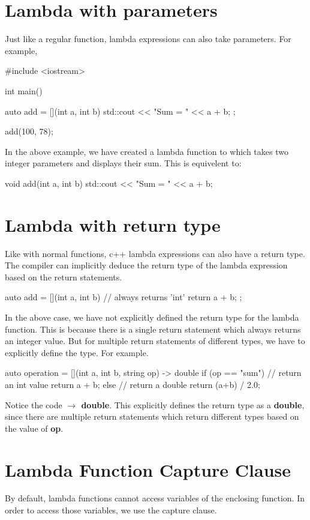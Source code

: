 \documentclass{report}
\begin{document}
  \section{Lambda with parameters}
  Just like a regular function, lambda expressions can also take parameters. For example, 
  \begin{cppcode}
   #include <iostream> 

   int main() {

     auto add = [](int a, int b) {
        std::cout << "Sum = " << a + b;
     };

     add(100, 78);
   }
  \end{cppcode}
  \bigbreak \noindent
  In the above example, we have created a lambda function to which takes two integer parameters and displays their sum.
  \bigbreak \noindent
  This is equivelent to:
  \begin{cppcode}
    void add(int a, int b) {
      std::cout << "Sum = " << a + b;
    }
  \end{cppcode}
  \section{Lambda with return type}
  Like with normal functions, c++ lambda expressions can also have a return type.
  \bigbreak \noindent
  The compiler can implicitly deduce the return type of the lambda expression based on the return statements.
  \begin{cppcode}
    auto add = [](int a, int b) {
      // always returns 'int'
      return a + b;
    };
  \end{cppcode}
  \noindent In the above case, we have not explicitly defined the return type for the lambda function. This is because there is a single return statement which always returns an integer value.
\bigbreak \noindent
But for multiple return statements of different types, we have to explicitly define the type. For example.
\begin{cppcode}
  auto operation = [](int a, int b, string op) -> double {
    if (op == "sum") {
      // return an int value
      return a + b;
    } else {
      // return a double
      return (a+b) / 2.0;
    }
  }
\end{cppcode}
\noindent Notice the code \textbf{ $\rightarrow$ double}. This explicitly defines the return type as a \textbf{double}, since there are multiple return statements which return different types based on the value of \textbf{op}.
\section{Lambda Function Capture Clause}
By default, lambda functions cannot access variables of the enclosing function. In order to access those variables, we use the capture clause. \vspace{1.5mm}
\end{document}
